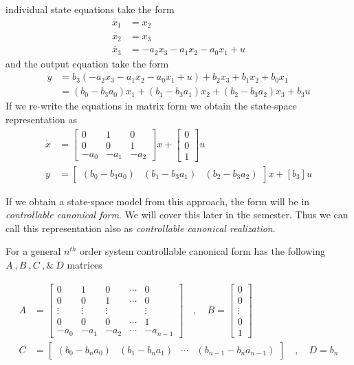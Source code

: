 \documentclass[twoside]{article}
\begin{document}
individual state equations take the form
%
\begin{align*}
\dot{x_1} &= x_2
\\
\dot{x_2} &= x_3
\\
\dot{x_3} &= -a_2 x_3 - a_1 x_2 - a_0 x_1 + u
\end{align*}
%
and the output equation take the form
%
\begin{align*}
y &= b_3\left( -a_2 x_3 - a_1 x_2 - a_0 x_1 + u \right) + b_2 x_3 +
    b_1 x_2 + b_0 x_1
\\
&= ( b_0 - b_3 a_0 ) x_1 + ( b_1 - b_3 a_1 ) x_2 + ( b_2 - b_3 a_2 ) x_3 + b_3 u
\end{align*}
%
If we re-write the equations in matrix form we obtain the state-space representation as
%
\begin{align*}
	\dot{x} &= \left[ \begin{array}{ccc} 0 & 1 & 0  \\  0 & 0 & 1 \\  -a_0 & -a_1 & -a_2 \end{array} \right] x 
	+ \left[ \begin{array}{c} 0 \\ 0 \\ 1 \end{array} \right] u
	\\
	y &= \left[ \begin{array}{ccc} ( b_0 - b_3 a_0 ) & ( b_1 - b_3 a_1 )  & ( b_2 - b_3 a_2 ) \end{array} \right] x
	+ \left[ b_3 \right] u
\end{align*}

If we obtain a state-space model from this approach, the form
will be in \textit{controllable canonical form}. We will cover this
later in the semester. Thus we can call this representation also as 
\textit{controllable canonical realization}. 

For a general $n^{th}$ order system controllable
canonical form has the following $A \ ,  B \ ,  C \ , \& \ D$
matrices

\begin{align*}
A &= \left[ \begin{array}{ccccc} 0 & 1 & 0 & \cdots & 0 \\ 0 & 0 & 1 &
                                                                      \cdots & 0
\\ \vdots & \vdots & \vdots & & \vdots
\\ 0 & 0 & 0 & \cdots & 1
    \\ -a_0 & -a_1 & -a_2 & \cdots & -a_{n-1} \end{array} \right]
\quad , \quad 
B = \left[ \begin{array}{c} 0\\ 0 \\ \vdots \\ 0
    \\ 1 \end{array} \right]
\\ C &= \left[ \begin{array}{cccc} (b_0 - b_n a_0) 
  &  (b_1 - b_n a_1) & \cdots & (b_{n-1} - b_n a_{n-1}) \end{array} \right]
\quad , \quad
D = b_n
\end{align*}
\end{document}
